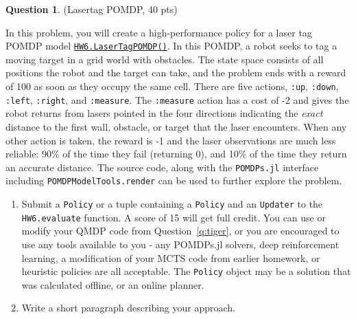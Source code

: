 \documentclass{article}
\theoremstyle{definition}
\newtheorem{question}[thm]{Question}
\begin{document}
\begin{question}
    (Lasertag POMDP, 40 pts)
    
    In this problem, you will create a high-performance policy for a laser tag POMDP model \href{https://github.com/zsunberg/DMUStudent.jl/blob/master/src/HW6.jl#L20-L268}{\texttt{HW6.LaserTagPOMDP()}}.  In this POMDP, a robot seeks to tag a moving target in a grid world with obstacles. The state space consists of all positions the robot and the target can take, and the problem ends with a reward of 100 as soon as they occupy the same cell. There are five actions, \texttt{:up}, \texttt{:down}, \texttt{:left}, \texttt{:right}, and \texttt{:measure}. The \texttt{:measure} action has a cost of -2 and gives the robot returns from lasers pointed in the four directions indicating the \emph{exact} distance to the first wall, obstacle, or target that the laser encounters. When any other action is taken, the reward is -1 and the laser observations are much less reliable: 90\% of the time they fail (returning 0), and 10\% of the time they return an accurate distance. The source code, along with the \texttt{POMDPs.jl} interface including \texttt{POMDPModelTools.render} can be used to further explore the problem.

    \begin{enumerate}[label=\alph*)]
        \item Submit a \texttt{Policy} or a tuple containing a \texttt{Policy} and an \texttt{Updater} to the \texttt{HW6.evaluate} function. A score of 15 will get full credit. You can use or modify your QMDP code from Question~\ref{q:tiger}, or you are encouraged to use any tools available to you - any POMDPs.jl solvers, deep reinforcement learning, a modification of your MCTS code from earlier homework, or heuristic policies are all acceptable. The \texttt{Policy} object may be a solution that was calculated offline, or an online planner.
        \item Write a short paragraph describing your approach.
    \end{enumerate}
\end{question}
\end{document}
